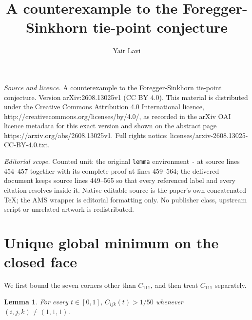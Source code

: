 \documentclass[10pt,a4paper]{amsart}
\newtheorem{lemma}[theorem]{Lemma}
\begin{document}
\title[A counterexample to the Foregger-Sinkhorn tie-point conjectu]{A counterexample to the Foregger-Sinkhorn tie-point conjecture}
\author{Yair Lavi}
\date{}
\maketitle
\noindent\emph{Source and licence.} A counterexample to the Foregger-Sinkhorn tie-point conjecture. Version arXiv:2608.13025v1 (CC BY 4.0). This material is distributed under the Creative Commons Attribution 4.0 International licence, http://creativecommons.org/licenses/by/4.0/, as recorded in the arXiv OAI licence metadata for this exact version and shown on the abstract page https://arxiv.org/abs/2608.13025v1. Full rights notice: licenses/arxiv-2608.13025-CC-BY-4.0.txt.\par\smallskip
\noindent\textit{Editorial scope.} Counted unit: the original \texttt{lemma} environment \texttt{-} at source lines 454--457 together with its complete proof at lines 459--564; the delivered document keeps source lines 449--565 so that every referenced label and every citation resolves inside it. Native editable source is the paper's own concatenated TeX; the AMS wrapper is editorial formatting only. No publisher class, upstream script or unrelated artwork is redistributed.
\section{Unique global minimum on the closed face}

We first bound the seven corners other than \(C_{111}\), and then treat
\(C_{111}\) separately.


\begin{lemma}
For every \(t\in[0,1]\), \(C_{ijk}(t)>1/50\) whenever
\((i,j,k)\ne(1,1,1)\).
\end{lemma}
\end{document}

